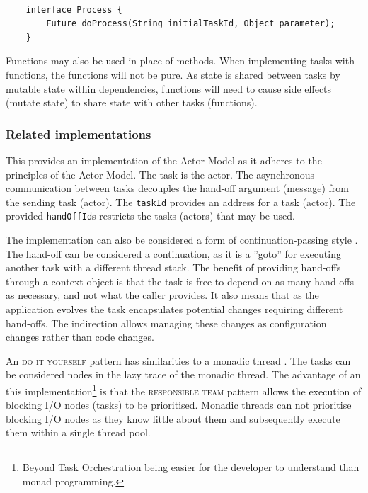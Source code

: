 \documentclass[prodmode]{style/acmlarge}
\begin{document}
\begin{lstlisting}[float,label=lst:ContinuationInjectionInterface]

    interface Process {
        Future doProcess(String initialTaskId, Object parameter);
    }
\end{lstlisting}

Functions may also be used in place of methods.  When implementing tasks with
functions, the functions will not be pure.  As state is shared between tasks by
mutable state within dependencies, functions will need to cause side effects
(mutate state) to share state with other tasks (functions).



\subsubsection*{Related implementations}

This provides an implementation of the Actor Model \cite{actors} as it adheres
to the principles of the Actor Model.  The task is the actor.  The asynchronous
communication between tasks decouples the hand-off argument (message) from the
sending task (actor).  The \texttt{taskId} provides an address for a task
(actor).  The provided \texttt{handOffId}s restricts the tasks (actors) that may
be used.

The implementation can also be considered a form of continuation-passing style
\cite{continuations}.  The hand-off can be considered a continuation, as it is a
''goto'' for executing another task with a different thread stack.  The benefit
of providing hand-offs through a context object is that the task is free to
depend on as many hand-offs as necessary, and not what the caller provides.  It
also means that as the application evolves the task encapsulates potential
changes requiring different hand-offs.  The indirection allows managing these
changes as configuration changes rather than code changes.

An \textsc{do it yourself} pattern has similarities to a monadic thread
\cite{monadic-thread}.  The tasks can be considered nodes in the lazy trace of
the monadic thread.  The advantage of an this implementation\footnote{Beyond
Task Orchestration being easier for the developer to understand than monad
programming.} is that the \textsc{responsible team} pattern allows the execution
of blocking I/O nodes (tasks) to be prioritised.  Monadic threads can not
prioritise blocking I/O nodes as they know little about them and subsequently
execute them within a single thread pool.
\end{document}
